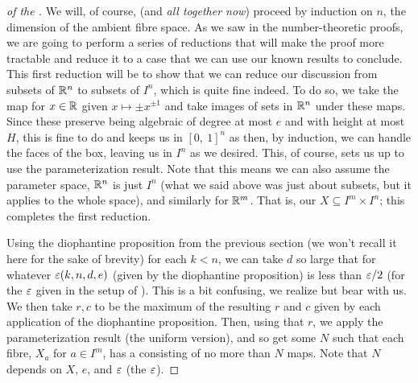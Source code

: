 \begin{proof}[of the \pwT]
  We will, of course, (and \emph{all together now}) proceed by induction on $n$, the dimension of the ambient fibre space. As we saw in the number-theoretic proofs, we are going to perform a series of reductions that will make the proof more tractable and reduce it to a case that we can use our known results to conclude. This first reduction will be to show that we can reduce our discussion from subsets of $\mathbb{R}^n$ to subsets of $I^n$, which is quite fine indeed. To do so, we take the map for $x \in \mathbb{R}$ given $x \mapsto \pm x^{\pm 1}$ and take images of sets in $\mathbb{R}^n$ under these maps. Since these preserve being algebraic of degree at most $e$ and with height at most $H$, this is fine to do and keeps us in $[0,  \ 1]^n$ as then, by induction, we can handle the faces of the box, leaving us in $I^n$ as we desired. This, of course, sets us up to use the parameterization result. Note that this means we can also assume the parameter space, $\mathbb{R}^n$ is just $I^n$ (what we said above was just about subsets, but it applies to the whole space), and similarly for $\mathbb{R}^m$. That is, our $X \subseteq I^m \times I^n$; this completes the first reduction.
  
  Using the diophantine proposition from the previous section (we won't recall it here for the sake of brevity) for each $k < n$, we can take $d$ so large that for whatever $\varepsilon (k, n, d, e)$ (given by the diophantine proposition) is less than $\varepsilon / 2$ (for the $\varepsilon$ given in the setup of \pw). This is a bit confusing, we realize but bear with us. We then take $r, c$ to be the maximum of the resulting $r$ and $c$ given by each application of the diophantine proposition. Then, using that $r$, we apply the parameterization result (the uniform version), and so get some $N$ such that each fibre, $X_a$ for $a \in I^m$, has a \cellrparam consisting of no more than $N$ maps. Note that $N$ depends on $X$, $e$, and $\varepsilon$ (the \pw $\varepsilon$).
  

\end{proof}
